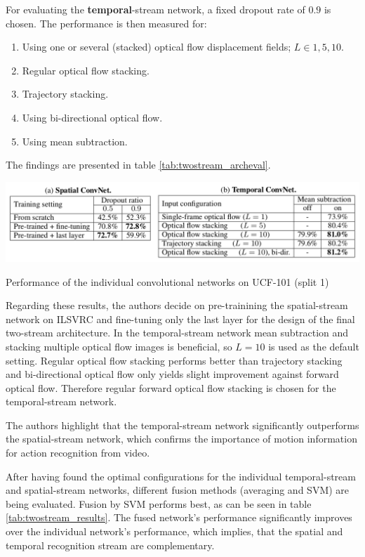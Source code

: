 For evaluating the \textbf{temporal}-stream network, a fixed dropout rate of $0.9$ is chosen.
The performance is then measured for:
\begin{enumerate}
    \item Using one or several (stacked) optical flow displacement fields; $L \in {1,5,10}$.
    \item Regular optical flow stacking.
    \item Trajectory stacking.
    \item Using bi-directional optical flow.
    \item Using mean subtraction.
\end{enumerate}

The findings are presented in table \ref{tab:twostream_archeval}.
\begin{table}[H]
    \centering
    \includegraphics[width=\textwidth]{img_deep/twostream_archeval}
    \caption{Performance of the individual convolutional networks on UCF-101 (split 1) \cite{simonyan_two-stream_2014}}
    \label{tab:twostream_archeval}
\end{table}

Regarding these results, the authors decide on pre-trainining the spatial-stream network on ILSVRC and fine-tuning only the last layer for the design of the final two-stream architecture.
In the temporal-stream network mean subtraction and stacking multiple optical flow images is beneficial, so $L=10$ is used as the default setting.
Regular optical flow stacking performs better than trajectory stacking and bi-directional optical flow only yields slight improvement against forward optical flow.
Therefore regular forward optical flow stacking is chosen for the temporal-stream network.

The authors highlight that the temporal-stream network significantly outperforms the spatial-stream network, which confirms the importance of motion information for action recognition from video.

After having found the optimal configurations for the individual temporal-stream and spatial-stream networks, different fusion methods (averaging and SVM) are being evaluated.
Fusion by SVM performs best, as can be seen in table \ref{tab:twostream_results}.
The fused network's performance significantly improves over the individual network's performance, which implies, that the spatial and temporal recognition stream are complementary.

